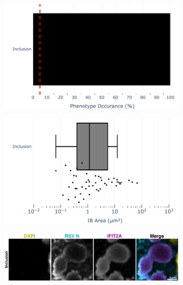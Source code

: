 \begin{figure}
    \begin{subfigure}{0.5\textwidth}
        \caption{}
        \includegraphics[width=1\linewidth]{10. Chapter 5/Figs/02. pIB/02. IFIT2A/04. bar_i2a_vero_hnhp.pdf} 
    \end{subfigure}
    \begin{subfigure}{0.5\textwidth}
        \caption{}
        \includegraphics[width=1\linewidth]{10. Chapter 5/Figs/02. pIB/02. IFIT2A/05. box_i2a_vero_hnhp.pdf}
    \end{subfigure}
    \begin{subfigure}{1\textwidth}
        \caption{}
        \includegraphics[width=1\linewidth]{10. Chapter 5/Figs/02. pIB/02. IFIT2A/06. i2a-vero-hnhp.pdf} 

\end{subfigure}
\end{figure}
